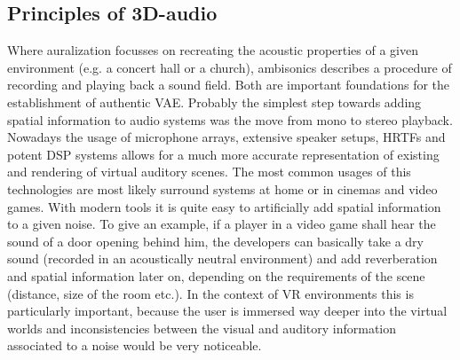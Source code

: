 \documentclass[a4paper,11pt]{article}%
\renewcommand{\\}{\vspace*{0.5\baselineskip} \newline}
\begin{document}



\subsection{Principles of 3D-audio}
\label{Sec:auralization}
Where auralization focusses on recreating the acoustic properties of a given environment (e.g. a concert hall or a church), ambisonics describes a procedure of recording and playing back a sound field. Both are important foundations for the establishment of authentic \acf{VAE}. 
\newline
\newline
Probably the simplest step towards adding spatial information to audio systems was the move from mono to stereo playback. Nowadays the usage of microphone arrays, extensive speaker setups, \ac{HRTF}s and potent \acs{DSP} systems allows for a much more accurate representation of existing and rendering of virtual auditory scenes.
\newline
\newline
The most common usages of this technologies are most likely surround systems at home or in cinemas and video games. With modern tools it is quite easy to artificially add spatial information to a given noise. To give an example, if a player in a video game shall hear the sound of a door opening behind him, the developers can basically take a \dq dry\dq{} sound (recorded in an acoustically neutral environment) and add reverberation and spatial information later on, depending on the requirements of the scene (distance, size of the room etc.).
\newline
\newline
In the context of \ac{VR} environments this is particularly important, because the user is immersed way deeper into the virtual worlds and inconsistencies between the visual and auditory information associated to a noise would be very noticeable. %
\end{document}
